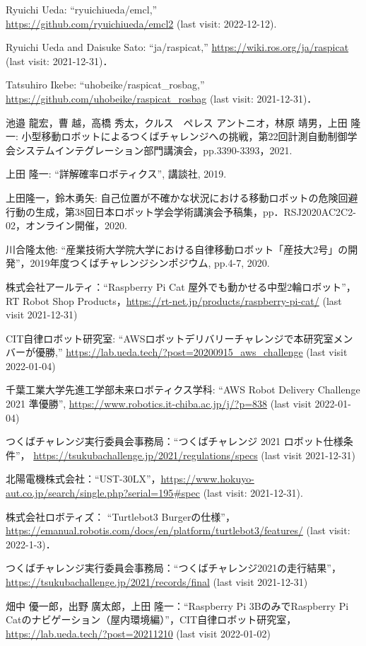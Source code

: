\documentclass[twocolumn,9pt]{jsproceedings}
\begin{document}
\begin{thebibliography}{99}
  Ryuichi Ueda: ``ryuichiueda/emcl,''\\\url{https://github.com/ryuichiueda/emcl2} (last visit: 2022-12-12).

  Ryuichi Ueda and Daisuke Sato: ``ja/raspicat,'' \url{https://wiki.ros.org/ja/raspicat} (last visit: 2021-12-31)．
  
  Tatsuhiro Ikebe: ``uhobeike/raspicat\_rosbag,'' \url{https://github.com/uhobeike/raspicat_rosbag} (last visit: 2021-12-31)．

 池邉 龍宏，曹 越，高橋 秀太，クルス　ペレス アントニオ，林原 靖男，上田 隆一: 小型移動ロボットによるつくばチャレンジへの挑戦，第22回計測自動制御学会システムインテグレーション部門講演会，pp.3390-3393，2021.

上田 隆一: ``詳解確率ロボティクス'', 講談社, 2019.

 上田隆一，鈴木勇矢: 自己位置が不確かな状況における移動ロボットの危険回避行動の生成，第38回日本ロボット学会学術講演会予稿集，pp．RSJ2020AC2C2-02，オンライン開催，2020.

  川合隆太他: ``産業技術大学院大学における自律移動ロボット「産技大2号」の開発''，2019年度つくばチャレンジシンポジウム, pp.4-7, 2020.

  株式会社アールティ：``Raspberry Pi Cat 屋外でも動かせる中型2輪ロボット''，
  RT Robot Shop Products，\url{https://rt-net.jp/products/raspberry-pi-cat/} (last visit 2021-12-31)

	  CIT自律ロボット研究室: ``AWSロボットデリバリーチャレンジで本研究室メンバーが優勝,'' \url{https://lab.ueda.tech/?post=20200915_aws_challenge} (last visit 2022-01-04)

	  千葉工業大学先進工学部未来ロボティクス学科: ``AWS Robot Delivery Challenge 2021 準優勝'', \url{https://www.robotics.it-chiba.ac.jp/j/?p=838} (last visit 2022-01-04)
  
  つくばチャレンジ実行委員会事務局：``つくばチャレンジ 2021 ロボット仕様条件''，
  \url{https://tsukubachallenge.jp/2021/regulations/specs} (last visit 2021-12-31)
  
  北陽電機株式会社：``UST-30LX''，\url{https://www.hokuyo-aut.co.jp/search/single.php?serial=195#spec} (last visit: 2021-12-31).
  
  株式会社ロボティズ： ``Turtlebot3 Burgerの仕様''，\url{https://emanual.robotis.com/docs/en/platform/turtlebot3/features/} (last visit: 2022-1-3)．
  
  つくばチャレンジ実行委員会事務局：``つくばチャレンジ2021の走行結果''，
  \url{https://tsukubachallenge.jp/2021/records/final} (last visit 2021-12-31)

	  畑中 優一郎，出野 廣太郎，上田 隆一：``Raspberry Pi 3BのみでRaspberry Pi Catのナビゲーション（屋内環境編）''，CIT自律ロボット研究室，\url{https://lab.ueda.tech/?post=20211210} (last visit 2022-01-02)
\end{thebibliography}
\normalsize
\end{document}
